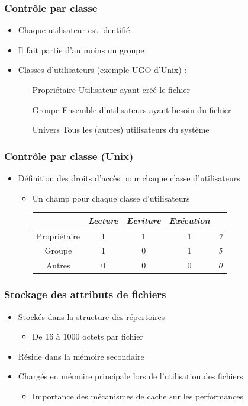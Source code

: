 \begin{frame}
\frametitle{Contrôle par classe}
\begin{itemize}
\item Chaque utilisateur est identifié
\item Il fait partie d'au moins un groupe
\item Classes d'utilisateurs (exemple UGO d'Unix) :
\begin{itemize}
\item [Propriétaire] Utilisateur ayant créé le fichier
\item [Groupe] Ensemble d'utilisateurs ayant besoin du fichier
\item [Univers] Tous les (autres) utilisateurs du système
\end{itemize}
\end{itemize}
\end{frame}

\begin{frame}
\frametitle{Contrôle par classe (Unix)}
\begin{itemize}
\item Définition des droits d'accès pour chaque classe d'utilisateurs
\begin{itemize}
\item Un champ pour chaque classe d'utilisateurs
\begin{tabular}{c|c|c|c|c}
& \textit{Lecture} & \textit{Ecriture} & \textit{Exécution} &  \\ 
\hline
Propriétaire & 1 & 1 & 1 & \textit{7} \\ 
Groupe & 1 & 0 & 1 & \textit{5} \\ 
Autres & 0 & 0 & 0 & \textit{0} \\  
\end{tabular} 
\end{itemize}
\end{itemize}
\end{frame}



\begin{frame}
\frametitle{Stockage des attributs de fichiers}
\begin{itemize}
\item Stockés dans la structure des répertoires
\begin{itemize}
\item De 16 à 1000 octets par fichier
\end{itemize}
\item Réside dans la mémoire secondaire
\item Chargés en mémoire principale lors de l'utilisation des fichiers
\begin{itemize}
\item Importance des mécanismes de cache sur les performances
\end{itemize}
\end{itemize}
\end{frame}


